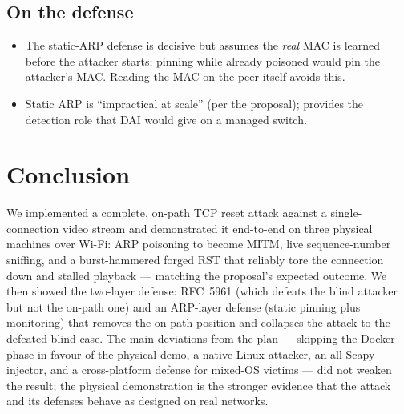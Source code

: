 \documentclass[11pt,a4paper]{article}
\newcommand{\code}[1]{\texttt{\detokenize{#1}}}
\begin{document}
\subsection{On the defense}
\begin{itemize}[leftmargin=1.4em,itemsep=2pt]
  \item The static-ARP defense is decisive but assumes the \emph{real} MAC is
        learned before the attacker starts; pinning while already poisoned would
        pin the attacker's MAC. Reading the MAC on the peer itself avoids this.
  \item Static ARP is ``impractical at scale'' (per the proposal); \code{arp_watch}
        provides the detection role that DAI would give on a managed switch.
\end{itemize}

\section{Conclusion}
We implemented a complete, on-path TCP reset attack against a single-connection
video stream and demonstrated it end-to-end on three physical machines over
Wi-Fi: ARP poisoning to become MITM, live sequence-number sniffing, and a
burst-hammered forged RST that reliably tore the connection down and stalled
playback — matching the proposal's expected outcome. We then showed the
two-layer defense: RFC~5961 (which defeats the blind attacker but not the on-path
one) and an ARP-layer defense (static pinning plus monitoring) that removes the
on-path position and collapses the attack to the defeated blind case. The main
deviations from the plan — skipping the Docker phase in favour of the physical
demo, a native Linux attacker, an all-Scapy injector, and a cross-platform
defense for mixed-OS victims — did not weaken the result; the physical
demonstration is the stronger evidence that the attack and its defenses behave as
designed on real networks.

\appendix
\end{document}
